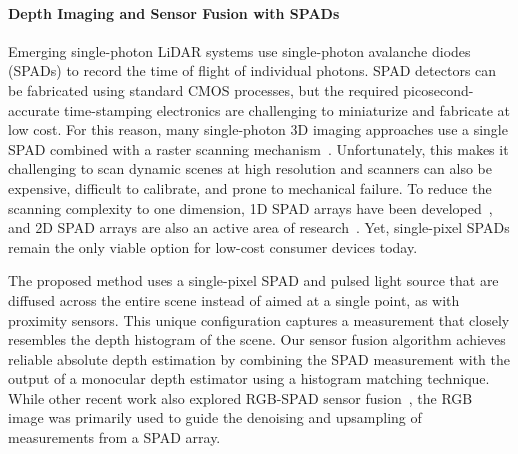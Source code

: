 \paragraph{Depth Imaging and Sensor Fusion with SPADs}
%
Emerging single-photon LiDAR systems use single-photon avalanche diodes (SPADs) to record the time of flight of individual photons. SPAD detectors can be fabricated using standard CMOS processes, but the required picosecond-accurate time-stamping electronics are challenging to miniaturize and fabricate at low cost. For this reason, many single-photon 3D imaging approaches use a single SPAD combined with a raster scanning mechanism~\cite{Kirmani:2014,Lamb2010,Li:2019,pawlikowska2017single}. Unfortunately, this makes it challenging to scan dynamic scenes at high resolution and scanners can also be expensive, difficult to calibrate, and prone to mechanical failure. To reduce the scanning complexity to one dimension, 1D SPAD arrays have been developed~\cite{burri2017linospad,burri2016linospad,OToole2017}, and 2D SPAD arrays are also an active area of research~\cite{Niclass2005,Stoppa2007,Veerappan2011,Zhang2018}. Yet, single-pixel SPADs remain the only viable option for low-cost consumer devices today.

The proposed method uses a single-pixel SPAD and pulsed light source that are diffused across the entire scene instead of aimed at a single point, as with proximity sensors. This unique configuration captures a measurement that closely resembles the depth histogram of the scene. Our sensor fusion algorithm achieves reliable absolute depth estimation by combining the SPAD measurement with the output of a monocular depth estimator using a histogram matching technique. While other recent work also explored RGB-SPAD sensor fusion~\cite{Lindell2018}, the RGB image was primarily used to guide the denoising and upsampling of measurements from a SPAD array.
 

